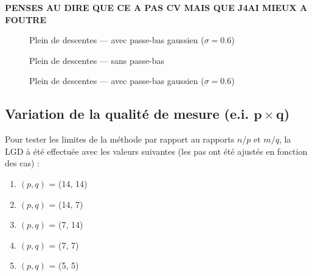 \documentclass[hidelinks, french]{article} %
\renewcommand{\bf}[1]{\boldsymbol{#1}}
\theoremstyle{enonce}
\theoremstyle{special}
\theoremstyle{rq}
\theoremstyle{exo}
\theoremstyle{demo}
\begin{document}
\textbf{\color{red}PENSES AU DIRE QUE CE A PAS CV MAIS QUE J4AI MIEUX A FOUTRE}

\begin{figure}[H]\centering
	
	\caption{Plein de descentes ---  avec passe-bas gaussien ($\sigma=0.6$)}
	\label{fig:LGDunif-g}
\end{figure}
\begin{figure}[H]\centering
	
    \caption{Plein de descentes --- sans passe-bas}
    \label{fig:LGDgauss-s}
\end{figure}
\begin{figure}[H]\centering
	
    \caption{Plein de descentes ---  avec passe-bas gaussien ($\sigma=0.6$)}
    \label{fig:LGDgauss-g}
\end{figure}




\subsection{Variation de la qualité de mesure (e.i. $\bf{p}\times\bf{q}$)}\label{sec:LGDsize}

Pour tester les limites de la méthode par rapport au rapports $n/p$ et $m/q$, la LGD à été effectuée avec les valeurs suivantes (les pas ont été ajustés en fonction des cas) :
\begin{enumerate}[label=(\arabic*)]
	\item $(p,q)$ = (14, 14)
	\item $(p,q)$ = (14, 7)
	\item $(p,q)$ = (7, 14)
	\item $(p,q)$ = (7, 7)
	\item $(p,q)$ = (5, 5)
\end{enumerate}
\end{document}
